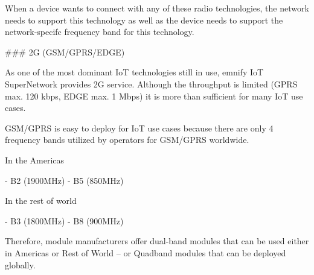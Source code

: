 \documentclass[11pt, oneside]{article}   	%
\newcommand{\addspace}{\vspace{2mm}}
\begin{document}
\addspace
\begin{markdown}
When a device wants to connect with any of these radio technologies, the network needs to support this technology as well as the device needs to support the network-specifc frequency band for this technology.

### 2G (GSM/GPRS/EDGE)

As one of the most dominant IoT technologies still in use, emnify IoT SuperNetwork provides 2G service.
Although the throughput is limited (GPRS max. 120 kbps, EDGE max. 1 Mbps) it is more than sufficient for many IoT use cases.

GSM/GPRS is easy to deploy for IoT use cases because there are only 4 frequency bands utilized by operators for GSM/GPRS worldwide.

In the Americas
\end{markdown}
\addspace
\begin{markdown}
- B2 (1900MHz)
- B5 (850MHz)
\end{markdown}
\addspace
\begin{markdown}
In the rest of world
\end{markdown}
\addspace
\begin{markdown}
- B3 (1800MHz)
- B8 (900MHz)
\end{markdown}
\addspace
\begin{markdown}
Therefore, module manufacturers offer dual-band modules that can be used either in Americas or Rest of World -- or Quadband modules that can be deployed globally.
\end{markdown}
\end{document}
